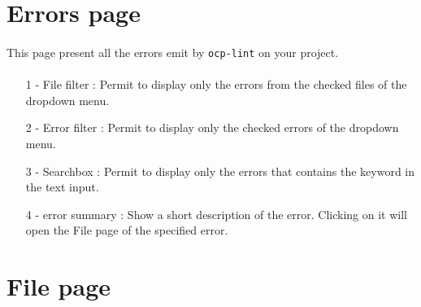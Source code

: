 \documentclass{article}
\begin{document}
\newpage

\section{Errors page}
\vspace{\baselineskip}

\paragraph{}

\vspace{\baselineskip}

\paragraph{}
This page present all the errors emit by \texttt{ocp-lint} on your project.

\paragraph{}
\begin{itemize}
	\item[1 -] File filter : Permit to display only the errors from the checked files of the dropdown menu.
	\item[2 -] Error filter : Permit to display only the checked errors of the dropdown menu.
    \item[3 -] Searchbox : Permit to display only the errors that contains the keyword in the text input.
    \item[4 -] error summary : Show a short description of the error. Clicking on it will open the File page of the specified error.
\end{itemize}

\newpage

\section{File page}
\vspace{\baselineskip}
\end{document}
